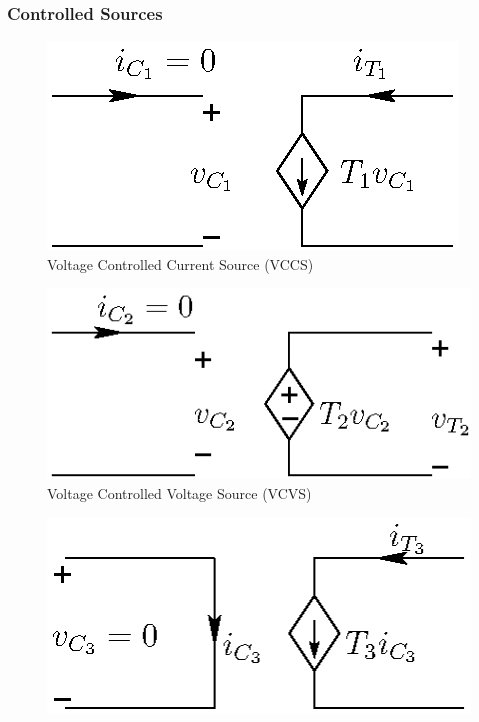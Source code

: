 \documentclass{beamer}
\begin{document}
\begin{frame}
\frametitle{Controlled Sources}
\begin{minipage}[!b]{0.47\linewidth} %
  \begin{figure}[!ht]
      \centering
      \includegraphics[scale=0.6]{../figures/VCCS.eps}
      \caption{\scriptsize Voltage Controlled Current Source (VCCS)}
      \label{vccs}
  \end{figure}
\end{minipage}
\begin{minipage}[!b]{0.47\linewidth}
  \begin{figure}[!ht]
     \centering
      \includegraphics[scale=0.6]{../figures/VCVS.eps}
      \caption{\scriptsize Voltage Controlled Voltage Source (VCVS) }
      \label{vcvs}
  \end{figure}
    \end{minipage}
\begin{minipage}[!b]{0.47\linewidth} %
  \begin{figure}[!ht]
      \centering
      \includegraphics[scale=0.6]{../figures/CCCS.eps}

\end{figure}
\end{minipage}
\end{frame}
\end{document}
